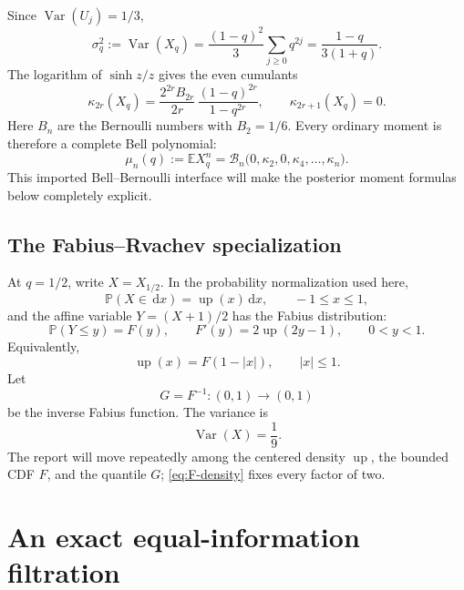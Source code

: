\documentclass[11pt,oneside]{article}
\theoremstyle{definition}
\theoremstyle{remark}
\newcommand{\E}{\mathbb E}
\newcommand{\Prob}{\mathbb P}
\newcommand{\Var}{\operatorname{Var}}
\newcommand{\Up}{\operatorname{up}}
\newcommand{\dd}{\,\mathrm d}
\newcommand{\abs}[1]{\left\lvert#1\right\rvert}
\begin{document}
Since $\Var(U_j)=1/3$,
\begin{equation}
 \sigma_q^2:=\Var(X_q)=\frac{(1-q)^2}{3}\sum_{j\ge0}q^{2j}
 =\frac{1-q}{3(1+q)}.
 \label{eq:variance}
\end{equation}
The logarithm of $\sinh z/z$ gives the even cumulants
\begin{equation}
 \kappa_{2r}(X_q)
 =\frac{2^{2r}B_{2r}}{2r}\,
   \frac{(1-q)^{2r}}{1-q^{2r}},
 \qquad
 \kappa_{2r+1}(X_q)=0.
 \label{eq:cumulants}
\end{equation}
Here $B_n$ are the Bernoulli numbers with $B_2=1/6$.  Every ordinary moment is
therefore a complete Bell polynomial:
\begin{equation}
 \mu_n(q):=\E X_q^n
 =\mathcal B_n\bigl(0,\kappa_2,0,\kappa_4,\ldots,\kappa_n\bigr).
 \label{eq:Bell-moments}
\end{equation}
This imported Bell--Bernoulli interface will make the posterior moment formulas
below completely explicit.

\subsection{The Fabius--Rvachev specialization}

At $q=1/2$, write $X=X_{1/2}$.  In the probability normalization used here,
\begin{equation}
 \Prob(X\in\dd x)=\Up(x)\dd x,
 \qquad -1\le x\le1,
 \label{eq:up-density}
\end{equation}
and the affine variable $Y=(X+1)/2$ has the Fabius distribution:
\begin{equation}
 \Prob(Y\le y)=F(y),
 \qquad F'(y)=2\Up(2y-1),
 \qquad 0<y<1.
 \label{eq:F-density}
\end{equation}
Equivalently,
\begin{equation}
 \Up(x)=F(1-\abs{x}),\qquad \abs{x}\le1.
 \label{eq:up-F}
\end{equation}
Let
\begin{equation}
 G=F^{-1}:(0,1)\longrightarrow(0,1)
 \label{eq:G}
\end{equation}
be the inverse Fabius function.  The variance is
\begin{equation}
 \Var(X)=\frac19.
 \label{eq:dyadic-var}
\end{equation}
The report will move repeatedly among the centered density $\Up$, the bounded CDF
$F$, and the quantile $G$; \eqref{eq:F-density} fixes every factor of two.

\section{An exact equal-information filtration}
\label{sec:exact-info}
\end{document}
